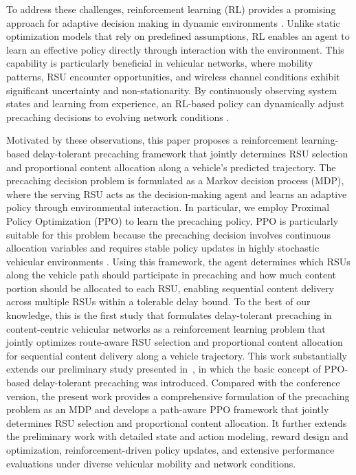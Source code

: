 \IEEEpubidadjcol

To address these challenges, reinforcement learning (RL) provides a promising approach for adaptive decision making in dynamic environments \cite{ReinforcementLearning}. 
Unlike static optimization models that rely on predefined assumptions, RL enables an agent to learn an effective policy directly through interaction with the environment. 
This capability is particularly beneficial in vehicular networks, where mobility patterns, RSU encounter opportunities, and wireless channel conditions exhibit significant uncertainty and non-stationarity. 
By continuously observing system states and learning from experience, an RL-based policy can dynamically adjust precaching decisions to evolving network conditions \cite{Policy-based}.

Motivated by these observations, this paper proposes a reinforcement learning-based delay-tolerant precaching framework that jointly determines RSU selection and proportional content allocation along a vehicle's predicted trajectory. 
The precaching decision problem is formulated as a Markov decision process (MDP), where the serving RSU acts as the decision-making agent and learns an adaptive policy through environmental interaction. 
In particular, we employ Proximal Policy Optimization (PPO) to learn the precaching policy. 
PPO is particularly suitable for this problem because the precaching decision involves continuous allocation variables and requires stable policy updates in highly stochastic vehicular environments \cite{PPO}. 
Using this framework, the agent determines which RSUs along the vehicle path should participate in precaching and how much content portion should be allocated to each RSU, enabling sequential content delivery across multiple RSUs within a tolerable delay bound. To the best of our knowledge, this is the first study that formulates 
delay-tolerant precaching in content-centric vehicular networks as a 
reinforcement learning problem that jointly optimizes route-aware RSU 
selection and proportional content allocation for sequential content 
delivery along a vehicle trajectory.
This work substantially extends our preliminary study presented in~\cite{Na2026ICAIIC}, in which the basic concept of PPO-based delay-tolerant precaching was introduced.
Compared with the conference version, the present work provides a comprehensive formulation of the precaching problem as an MDP and develops a path-aware PPO framework that jointly determines RSU selection and proportional content allocation.
It further extends the preliminary work with detailed state and action modeling, reward design and optimization, reinforcement-driven policy updates, and extensive performance evaluations under diverse vehicular mobility and network conditions.



